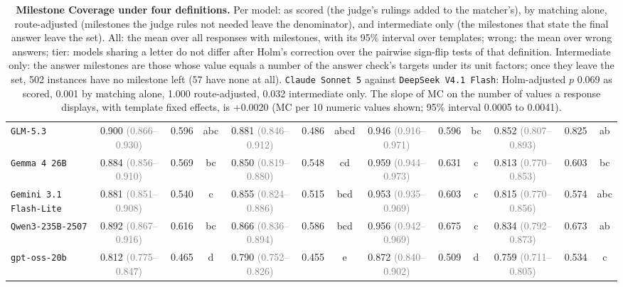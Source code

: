 \begin{table}[t]
{\begin{tabular}{l c r c c r c c r c c r c }
\texttt{GLM-5.3} & 0.900 {\scriptsize\textcolor{gray}{(0.866--0.930)}} & 0.596 & abc & 0.881 {\scriptsize\textcolor{gray}{(0.846--0.912)}} & 0.486 & abcd & 0.946 {\scriptsize\textcolor{gray}{(0.916--0.971)}} & 0.596 & bc & 0.852 {\scriptsize\textcolor{gray}{(0.807--0.893)}} & 0.825 & ab \\
\texttt{Gemma 4 26B} & 0.884 {\scriptsize\textcolor{gray}{(0.856--0.910)}} & 0.569 & bc & 0.850 {\scriptsize\textcolor{gray}{(0.819--0.880)}} & 0.548 & cd & 0.959 {\scriptsize\textcolor{gray}{(0.944--0.973)}} & 0.631 & c & 0.813 {\scriptsize\textcolor{gray}{(0.770--0.853)}} & 0.603 & bc \\
\texttt{Gemini 3.1 Flash-Lite} & 0.881 {\scriptsize\textcolor{gray}{(0.851--0.908)}} & 0.540 & c & 0.855 {\scriptsize\textcolor{gray}{(0.824--0.886)}} & 0.515 & bcd & 0.953 {\scriptsize\textcolor{gray}{(0.935--0.969)}} & 0.603 & c & 0.815 {\scriptsize\textcolor{gray}{(0.770--0.856)}} & 0.574 & abc \\
\texttt{Qwen3-235B-2507} & 0.892 {\scriptsize\textcolor{gray}{(0.867--0.916)}} & 0.616 & bc & 0.866 {\scriptsize\textcolor{gray}{(0.836--0.894)}} & 0.586 & bcd & 0.956 {\scriptsize\textcolor{gray}{(0.942--0.969)}} & 0.675 & c & 0.834 {\scriptsize\textcolor{gray}{(0.792--0.873)}} & 0.673 & ab \\
\texttt{gpt-oss-20b} & 0.812 {\scriptsize\textcolor{gray}{(0.775--0.847)}} & 0.465 & d & 0.790 {\scriptsize\textcolor{gray}{(0.752--0.826)}} & 0.455 & e & 0.872 {\scriptsize\textcolor{gray}{(0.840--0.902)}} & 0.509 & d & 0.759 {\scriptsize\textcolor{gray}{(0.711--0.805)}} & 0.534 & c \\
\bottomrule
\end{tabular}
}
\caption{\textbf{Milestone Coverage under four definitions.} Per model: as scored (the judge's
rulings added to the matcher's), by matching alone, route-adjusted (milestones the judge rules not
needed leave the denominator), and intermediate only (the milestones that state the final answer
leave the set). All: the mean over all responses with milestones, with its 95\% interval over
templates; wrong: the mean over wrong answers; tier: models sharing a letter do not differ after
Holm's correction over the pairwise sign-flip tests of that definition. Intermediate only: the
answer milestones are those whose value equals a number of the answer check's targets under its unit
factors; once they leave the set, 502 instances have no milestone left (57 have none at all).
\texttt{Claude Sonnet 5} against \texttt{DeepSeek V4.1 Flash}: Holm-adjusted $p$ 0.069 as scored,
0.001 by matching alone, 1.000 route-adjusted, 0.032 intermediate only. The slope of MC on the
number of values a response displays, with template fixed effects, is $+0.0020$ (MC per 10 numeric
values shown; 95\% interval 0.0005 to 0.0041).}
\label{tab:coverage_variants}
\end{table}

